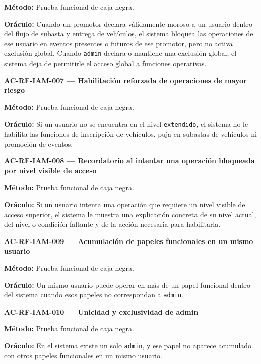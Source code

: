 \documentclass[10pt,letterpaper]{article}
\begin{document}
\textbf{Método:} Prueba funcional de caja negra.\par
\textbf{Oráculo:} Cuando un promotor declara válidamente moroso a un usuario dentro del flujo de subasta y entrega de vehículos, el sistema bloquea las operaciones de ese usuario en eventos presentes o futuros de ese promotor, pero no activa exclusión global. Cuando \texttt{admin} declara o mantiene una exclusión global, el sistema deja de permitirle el acceso global a funciones operativas.\par\vspace{0.45em}
\noindent\textbf{AC-RF-IAM-007 --- Habilitación reforzada de operaciones de mayor riesgo}\par
\textbf{Método:} Prueba funcional de caja negra.\par
\textbf{Oráculo:} Si un usuario no se encuentra en el nivel \texttt{extendido}, el sistema no le habilita las funciones de inscripción de vehículos, puja en subastas de vehículos ni promoción de eventos.\par\vspace{0.45em}
\noindent\textbf{AC-RF-IAM-008 --- Recordatorio al intentar una operación bloqueada por nivel visible de acceso}\par
\textbf{Método:} Prueba funcional de caja negra.\par
\textbf{Oráculo:} Si un usuario intenta una operación que requiere un nivel visible de acceso superior, el sistema le muestra una explicación concreta de su nivel actual, del nivel o condición faltante y de la acción necesaria para habilitarla.\par\vspace{0.45em}
\noindent\textbf{AC-RF-IAM-009 --- Acumulación de papeles funcionales en un mismo usuario}\par
\textbf{Método:} Prueba funcional de caja negra.\par
\textbf{Oráculo:} Un mismo usuario puede operar en más de un papel funcional dentro del sistema cuando esos papeles no correspondan a \texttt{admin}.\par\vspace{0.45em}
\noindent\textbf{AC-RF-IAM-010 --- Unicidad y exclusividad de admin}\par
\textbf{Método:} Prueba funcional de caja negra.\par
\textbf{Oráculo:} En el sistema existe un solo \texttt{admin}, y ese papel no aparece acumulado con otros papeles funcionales en un mismo usuario.\par\vspace{0.45em}
\end{document}
